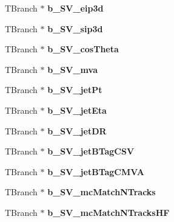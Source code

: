 \begin{DoxyCompactItemize}
\item 
\hypertarget{classMiniTree_a62c7f790f7d05d861dc974bbdb56ce17}{}\label{classMiniTree_a62c7f790f7d05d861dc974bbdb56ce17} 
T\+Branch $\ast$ {\bfseries b\+\_\+\+S\+V\+\_\+eip3d}
\item 
\hypertarget{classMiniTree_a71087cc4ae9ffb539b6e3a6d30787529}{}\label{classMiniTree_a71087cc4ae9ffb539b6e3a6d30787529} 
T\+Branch $\ast$ {\bfseries b\+\_\+\+S\+V\+\_\+sip3d}
\item 
\hypertarget{classMiniTree_a48782e04faedcbf431d877dbd721da68}{}\label{classMiniTree_a48782e04faedcbf431d877dbd721da68} 
T\+Branch $\ast$ {\bfseries b\+\_\+\+S\+V\+\_\+cos\+Theta}
\item 
\hypertarget{classMiniTree_aa114d36c971b13183da06722b18c7b98}{}\label{classMiniTree_aa114d36c971b13183da06722b18c7b98} 
T\+Branch $\ast$ {\bfseries b\+\_\+\+S\+V\+\_\+mva}
\item 
\hypertarget{classMiniTree_a8cc303cd13ae7ee896dd4cc8f0c744a4}{}\label{classMiniTree_a8cc303cd13ae7ee896dd4cc8f0c744a4} 
T\+Branch $\ast$ {\bfseries b\+\_\+\+S\+V\+\_\+jet\+Pt}
\item 
\hypertarget{classMiniTree_a86a30f49b18a8580f2abb13a86089437}{}\label{classMiniTree_a86a30f49b18a8580f2abb13a86089437} 
T\+Branch $\ast$ {\bfseries b\+\_\+\+S\+V\+\_\+jet\+Eta}
\item 
\hypertarget{classMiniTree_adb4515e20b6f340725dbd499d620e531}{}\label{classMiniTree_adb4515e20b6f340725dbd499d620e531} 
T\+Branch $\ast$ {\bfseries b\+\_\+\+S\+V\+\_\+jet\+DR}
\item 
\hypertarget{classMiniTree_a7727fe92e38fd55a89f6d09b67ed42a1}{}\label{classMiniTree_a7727fe92e38fd55a89f6d09b67ed42a1} 
T\+Branch $\ast$ {\bfseries b\+\_\+\+S\+V\+\_\+jet\+B\+Tag\+C\+SV}
\item 
\hypertarget{classMiniTree_a2a78386ceac9392123f77ecbec286ee4}{}\label{classMiniTree_a2a78386ceac9392123f77ecbec286ee4} 
T\+Branch $\ast$ {\bfseries b\+\_\+\+S\+V\+\_\+jet\+B\+Tag\+C\+M\+VA}
\item 
\hypertarget{classMiniTree_aea755272cd91936c891faf0360cb92b1}{}\label{classMiniTree_aea755272cd91936c891faf0360cb92b1} 
T\+Branch $\ast$ {\bfseries b\+\_\+\+S\+V\+\_\+mc\+Match\+N\+Tracks}
\item 
\hypertarget{classMiniTree_a60f305f8db17a61b46c49058028b4caf}{}\label{classMiniTree_a60f305f8db17a61b46c49058028b4caf} 
T\+Branch $\ast$ {\bfseries b\+\_\+\+S\+V\+\_\+mc\+Match\+N\+Tracks\+HF}
\item 
\hypertarget{classMiniTree_aa50cf5d17f4a664b05e50217f991f699}{}\label{classMiniTree_aa50cf5d17f4a664b05e50217f991f699} 

\end{DoxyCompactItemize}
